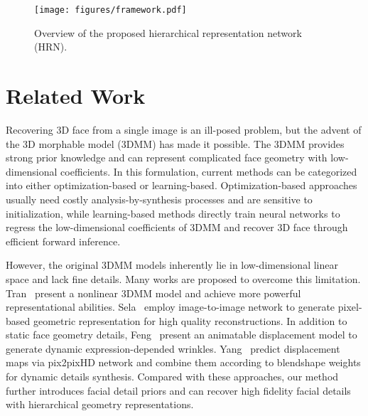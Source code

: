 \documentclass[10pt,twocolumn,letterpaper]{article}
\begin{document}
\begin{figure*}[t]
   \setlength{\belowcaptionskip}{-0.3cm}
   \setlength{\abovecaptionskip}{0.1cm}
\centerline{\texttt{[image: figures/framework.pdf]}}
\caption{Overview of the proposed hierarchical representation network (HRN).}
\label{fig:framework}
\end{figure*}

\section{Related Work}

 Recovering 3D face from a single image is an ill-posed problem, but the advent of the 3D morphable model (3DMM)\cite{blanz1999morphable,romdhani2005estimating} has made it possible. The 3DMM provides strong prior knowledge and can represent complicated face geometry with low-dimensional coefficients. In this formulation, current methods can be categorized into either optimization-based\cite{blanz1999morphable,hu2017avatar,zhu2015high,blanz2004statistical,kemelmacher2011face} or learning-based\cite{deng2019accurate, tewari2017mofa,zielonka2022towards,ruan2021sadrnet}. Optimization-based approaches usually need costly analysis-by-synthesis processes and are sensitive to initialization, while learning-based methods directly train neural networks to regress the low-dimensional coefficients of 3DMM and recover 3D face through efficient forward inference. 

However, the original 3DMM models inherently lie in low-dimensional linear space and lack fine details. Many works\cite{chen2020self,tran2018nonlinear,sela2017unrestricted,feng2021learning,yang2020facescape} are proposed to overcome this limitation. Tran~\etal\cite{tran2018nonlinear} present a nonlinear 3DMM model and achieve more powerful representational abilities. Sela~\etal\cite{sela2017unrestricted} employ image-to-image network to generate pixel-based geometric representation for high quality reconstructions. In addition to static face geometry details, Feng~\etal\cite{feng2021learning} present an animatable displacement model to generate dynamic expression-depended wrinkles. Yang~\etal\cite{yang2020facescape} predict displacement maps via pix2pixHD network and combine them according to blendshape weights for dynamic details synthesis. Compared with these approaches, our method further introduces facial detail priors and can recover high fidelity facial details with hierarchical geometry representations.
\end{document}
